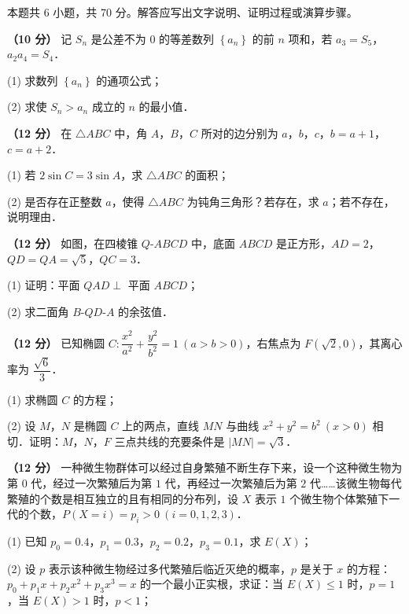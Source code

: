 \par\medskip


\begin{gktip}
本题共 6 小题，共 70 分。解答应写出文字说明、证明过程或演算步骤。
\end{gktip}

\textbf{（10 分）} 记 $S_n$ 是公差不为 $0$ 的等差数列 $\left\{a_n\right\}$ 的前 $n$ 项和，若 $a_3=S_5$，$a_2a_4=S_4$．

  (1) 求数列 $\left\{a_n\right\}$ 的通项公式；

  (2) 求使 $S_n>a_n$ 成立的 $n$ 的最小值．

\textbf{（12 分）} 在 $\triangle ABC$ 中，角 $A$，$B$，$C$ 所对的边分别为 $a$，$b$，$c$，$b=a+1$，$c=a+2$．

  (1) 若 $2\sin C=3\sin A$，求 $\triangle ABC$ 的面积；

  (2) 是否存在正整数 $a$，使得 $\triangle ABC$ 为钝角三角形？若存在，求 $a$；若不存在，说明理由．

\textbf{（12 分）} 如图，在四棱锥 $Q\text{-}ABCD$ 中，底面 $ABCD$ 是正方形，$AD=2$，$QD=QA=\sqrt5$，$QC=3$．

\begin{center}\end{center}

  (1) 证明：平面 $QAD\perp$ 平面 $ABCD$；

  (2) 求二面角 $B\text{-}QD\text{-}A$ 的余弦值．

\textbf{（12 分）} 已知椭圆 $C:\dfrac{x^{2}}{a^{2}}+\dfrac{y^{2}}{b^{2}}=1\ (a>b>0)$，右焦点为 $F\left(\sqrt2,0\right)$，其离心率为 $\dfrac{\sqrt6}3$．

  (1) 求椭圆 $C$ 的方程；

  (2) 设 $M$，$N$ 是椭圆 $C$ 上的两点，直线 $MN$ 与曲线 $x^{2}+y^{2}=b^{2}\ (x>0)$ 相切．证明：$M$，$N$，$F$ 三点共线的充要条件是 $|MN|=\sqrt3$．

\textbf{（12 分）} 一种微生物群体可以经过自身繁殖不断生存下来，设一个这种微生物为第 $0$ 代，经过一次繁殖后为第 $1$ 代，再经过一次繁殖后为第 $2$ 代……该微生物每代繁殖的个数是相互独立的且有相同的分布列，设 $X$ 表示 $1$ 个微生物个体繁殖下一代的个数，$P(X=i)=p_i>0\ (i=0,1,2,3)$．

  (1) 已知 $p_0=0.4$，$p_1=0.3$，$p_2=0.2$，$p_3=0.1$，求 $E(X)$；

  (2) 设 $p$ 表示该种微生物经过多代繁殖后临近灭绝的概率，$p$ 是关于 $x$ 的方程：$p_0+p_1x+p_2x^{2}+p_3x^{3}=x$ 的一个最小正实根，求证：当 $E(X)\le1$ 时，$p=1$，当 $E(X)>1$ 时，$p<1$；


